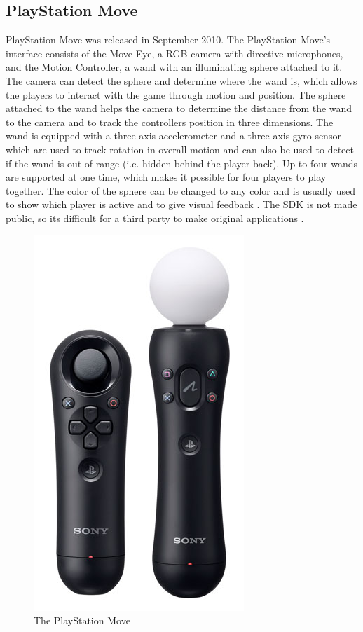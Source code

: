 \subsection{PlayStation Move}
PlayStation Move was released in September 2010. The PlayStation Move’s interface consists of the Move Eye, a RGB camera with directive microphones, and the Motion Controller, a wand with an illuminating sphere attached to it. The camera can detect the sphere and determine where the wand is, which allows the players to interact with the game through motion and position. The sphere attached to the wand helps the camera to determine the distance from the wand to the camera and to track the controllers position in three dimensions. The wand is equipped with a three-axis accelerometer and a three-axis gyro sensor which are used to track rotation in overall motion and can also be used to detect if the wand is out of range (i.e. hidden behind the player back). \cite{comparison} Up to four wands are supported at one time, which makes it possible for four players to play together. The color of the sphere can be changed to any color and is usually used to show which player is active and to give visual feedback \cite{ppmove}. The SDK is not made public, so its difficult for a third party to make original applications \cite{comparison}. 
\begin{figure}[h!]
\begin{center}
\includegraphics[scale=0.3]{PSmove}
\caption[PlayStation Move]{The PlayStation Move}
\label{fig:PSMove}
\end{center}
\end{figure}

